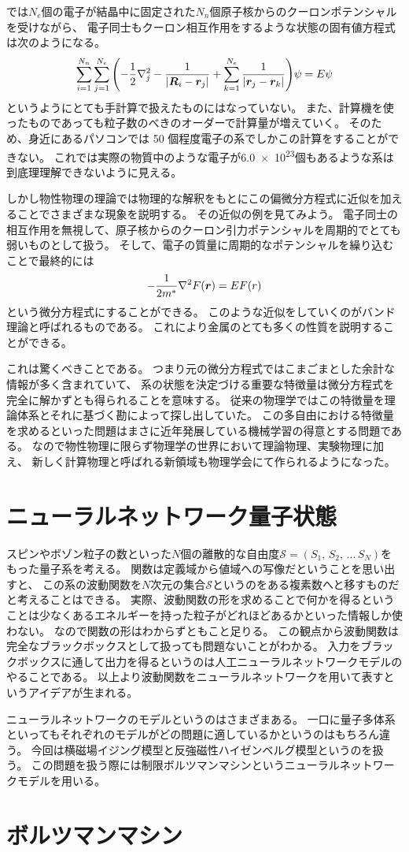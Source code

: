 \documentclass[twocolumn,10pt,dvipdfmx,a4paper]{jsarticle}
\begin{document}
では\(N_e\)個の電子が結晶中に固定された\(N_n\)個原子核からのクーロンポテンシャルを受けながら、
電子同士もクーロン相互作用をするような状態の固有値方程式は次のようになる。
\begin{align}
    \sum_{i=1}^{N_n}\sum_{j=1}^{N_e}\qty(-\frac{1}{2}\laplacian_j
    -\frac{1}{\abs{\vb*{R}_i-\vb*{r}_j}}
    +\sum_{k=1}^{N_e}\frac{1}{\abs{\vb*{r}_j-\vb*{r}_k}})\psi = E\psi
    \label{eq:no2}
\end{align}
というようにとても手計算で扱えたものにはなっていない。
また、計算機を使ったものであっても粒子数のべきのオーダーで計算量が増えていく。
そのため、身近にあるパソコンでは 50 個程度電子の系でしかこの計算をすることができない。
これでは実際の物質中のような電子が\num{6.0e23}個もあるような系は到底理理解できないように見える。

しかし物性物理の理論では物理的な解釈をもとにこの偏微分方程式に近似を加えることでさまざまな現象を説明する。
その近似の例を見てみよう。
電子同士の相互作用を無視して、原子核からのクーロン引力ポテンシャルを周期的でとても弱いものとして扱う。
そして、電子の質量に周期的なポテンシャルを繰り込むことで最終的には
\begin{equation}
    -\frac{1}{2m^*}\laplacian F(\vb*{r}) = E F(r)
\end{equation}
という微分方程式にすることができる。
このような近似をしていくのがバンド理論と呼ばれるものである。
これにより金属のとても多くの性質を説明することができる。

これは驚くべきことである。
つまり元の微分方程式ではこまごまとした余計な情報が多く含まれていて、
系の状態を決定づける重要な特徴量は微分方程式を完全に解かずとも得られることを意味する。
従来の物理学ではこの特徴量を理論体系とそれに基づく勘によって探し出していた。
この多自由における特徴量を求めるといった問題はまさに近年発展している機械学習の得意とする問題である。
なので物性物理に限らず物理学の世界において理論物理、実験物理に加え、
新しく計算物理と呼ばれる新領域も物理学会にて作られるようになった。

\section{ニューラルネットワーク量子状態}
スピンやボゾン粒子の数といった\(N\)個の離散的な自由度\(\mathcal{S}=(S_1,\,S_2,\,\dots\, S_N)\)をもった量子系を考える。
関数は定義域から値域への写像だということを思い出すと、
この系の波動関数を\(N\)次元の集合\(\mathcal{S}\)というのをある複素数へと移すものだと考えることはできる。
実際、波動関数の形を求めることで何かを得るということは少なくあるエネルギーを持った粒子がどれほどあるかといった情報しか使わない。
なので関数の形はわからずともこと足りる。
この観点から波動関数は完全なブラックボックスとして扱っても問題ないことがわかる。
入力をブラックボックスに通して出力を得るというのは人工ニューラルネットワークモデルのやることである。
以上より波動関数をニューラルネットワークを用いて表すというアイデアが生まれる。

ニューラルネットワークのモデルというのはさまざまある。
一口に量子多体系といってもそれぞれのモデルがどの問題に適しているかというのはもちろん違う。
今回は横磁場イジング模型と反強磁性ハイゼンベルグ模型というのを扱う。
この問題を扱う際には制限ボルツマンマシンというニューラルネットワークモデルを用いる。

\section{ボルツマンマシン}




\end{document}
